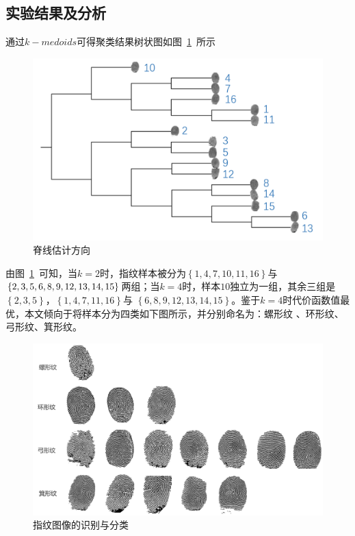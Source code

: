 \documentclass{whutmod}
\begin{document}
  	\subsection{实验结果及分析}
  	通过$k-medoids$可得聚类结果树状图如图~\ref{bgbgbg}~所示
  	\begin{figure}[H]
  		\centering
  		\includegraphics[width=.9\textwidth]{figures/tree.png}
  		\caption{脊线估计方向}\label{bgbgbg}
  	\end{figure}
  	由图~\ref{bgbgbg}~可知，当$k=2$时，指纹样本被分为$\left \{ 1,4,7,10,11,16 \right \}$与$\left \{ 2,3,5,6,8,9,\\
  	12,13,14,15 \right \}$两组；当$k=4$时，样本$10$独立为一组，其余三组是$\left \{ 2,3,5   \right \}$，$\left \{ 1,4,7,11,16 \right \}$与 $\left \{ 6,8,9,12,13,14,15 \right \}$。鉴于$k=4$时代价函数值最优，本文倾向于将样本分为四类如下图所示，并分别命名为：螺形纹
  	、环形纹、弓形纹、箕形纹。
  	  	\begin{figure}[H]
  		\centering
  		\includegraphics[width=.8\textwidth]{figures/gg.png}
  		\caption{指纹图像的识别与分类}\label{bgssssbgbg}
  	\end{figure}
  	
  	
\end{document}
